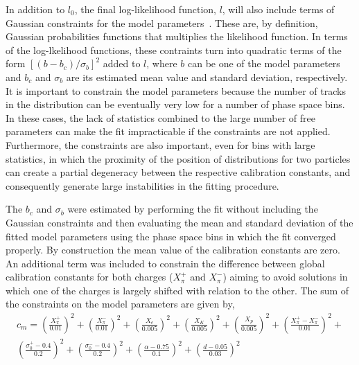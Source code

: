 In addition to $l_0$, the final log-likelihood function, $l$,
will also include terms of Gaussian constraints for the model
parameters~\cite{Karbach:2012vg}. These are, by definition, Gaussian probabilities
functions that multiplies the likelihood function. 
In terms of the log-lkelihood functions, these contraints
turn into quadratic terms of the
form $\left[(b-b_c)/\sigma_b\right]^2$ added to $l$,
where $b$ can be one of the model parameters and 
$b_c$ and $\sigma_b$ are its
estimated mean value and standard deviation, respectively.
It is important to constrain the model parameters because
the number of tracks in the \eps distribution
can be eventually very low for a number of phase space bins.
In these cases, the lack of statistics combined to
the large number of free parameters can make the fit
impracticable if the constraints are not applied.
Furthermore, the constraints are also important,
even for bins with large statistics,
in which the proximity of the position of \eps distributions
for two particles can create a partial degeneracy
between the respective calibration constants,
and consequently
generate large instabilities in the fitting procedure.

The $b_c$ and $\sigma_b$ were
estimated by performing the fit without including
the Gaussian constraints and then evaluating
the mean and standard deviation of the fitted model parameters
using the phase space bins in which the fit converged properly.
By construction the mean value of the calibration constants
are zero. An additional term was included to constrain the
difference between global calibration constants for both
charges ($X_{\pi}^+$ and $X_{\pi}^-$) aiming to avoid solutions
in which one of the charges is largely shifted
with relation to the other.
The sum of the constraints on the model parameters are given by,
\begin{multline}
  c_m = \left(\frac{X_{\pi}^+}{0.01}\right)^2+\left(\frac{X_{\pi}^-}{0.01}\right)^2+
  \left(\frac{X_{e}}{0.005}\right)^2+\left(\frac{X_{K}}{0.005}\right)^2+
  \left(\frac{X_{p}}{0.005}\right)^2+\left(\frac{X_{\pi}^+-X_{\pi}^-}{0.01}\right)^2+\\
  \left(\frac{\sigma_0^+-0.4}{0.2}\right)^2+\left(\frac{\sigma_0^--0.4}{0.2}\right)^2+
  \left(\frac{\alpha-0.75}{0.1}\right)^2+\left(\frac{d-0.05}{0.03}\right)^2
  \label{eq:hadron:dedx:fit:cm}
\end{multline}

